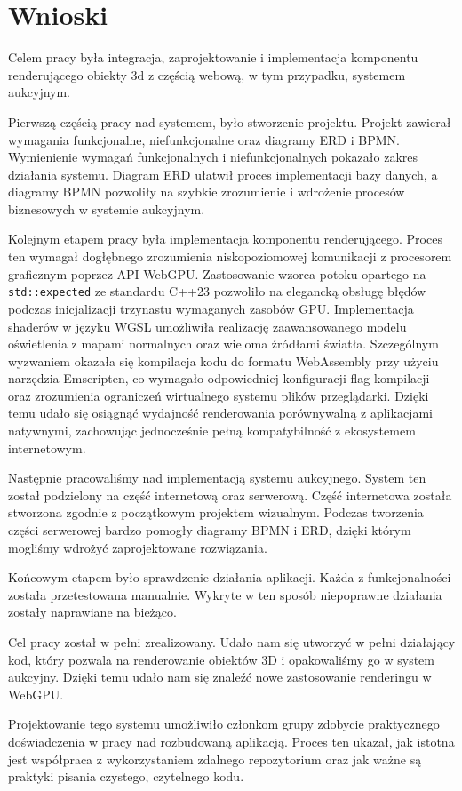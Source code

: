 \section{Wnioski}

Celem pracy była integracja, zaprojektowanie i implementacja komponentu renderującego obiekty 3d z częścią webową, w tym przypadku, systemem aukcyjnym.

Pierwszą częścią pracy nad systemem, było stworzenie projektu. Projekt zawierał wymagania funkcjonalne, niefunkcjonalne oraz diagramy ERD i BPMN. Wymienienie wymagań funkcjonalnych i niefunkcjonalnych pokazało zakres działania systemu. Diagram ERD ułatwił proces implementacji bazy danych, a diagramy BPMN pozwoliły na szybkie zrozumienie i wdrożenie procesów biznesowych w systemie aukcyjnym.

Kolejnym etapem pracy była implementacja komponentu renderującego. Proces ten wymagał dogłębnego zrozumienia niskopoziomowej komunikacji z procesorem graficznym poprzez API WebGPU. Zastosowanie wzorca potoku opartego na \texttt{std::expected} ze standardu C++23 pozwoliło na elegancką obsługę błędów podczas inicjalizacji trzynastu wymaganych zasobów GPU. Implementacja shaderów w języku WGSL umożliwiła realizację zaawansowanego modelu oświetlenia z mapami normalnych oraz wieloma źródłami światła. Szczególnym wyzwaniem okazała się kompilacja kodu do formatu WebAssembly przy użyciu narzędzia Emscripten, co wymagało odpowiedniej konfiguracji flag kompilacji oraz zrozumienia ograniczeń wirtualnego systemu plików przeglądarki. Dzięki temu udało się osiągnąć wydajność renderowania porównywalną z aplikacjami natywnymi, zachowując jednocześnie pełną kompatybilność z ekosystemem internetowym.

Następnie pracowaliśmy nad implementacją systemu aukcyjnego. System ten został podzielony na część internetową oraz serwerową. Część internetowa została stworzona zgodnie z początkowym projektem wizualnym. Podczas tworzenia części serwerowej bardzo pomogły diagramy BPMN i ERD, dzięki którym mogliśmy wdrożyć zaprojektowane rozwiązania.

Końcowym etapem było sprawdzenie działania aplikacji. Każda z funkcjonalności została przetestowana manualnie. Wykryte w ten sposób niepoprawne działania zostały naprawiane na bieżąco.

Cel pracy został w pełni zrealizowany. Udało nam się utworzyć w pełni działający kod, który pozwala na renderowanie obiektów 3D i opakowaliśmy go w system aukcyjny. Dzięki temu udało nam się znaleźć nowe zastosowanie renderingu w WebGPU.

Projektowanie tego systemu umożliwiło członkom grupy zdobycie praktycznego doświadczenia w pracy nad rozbudowaną aplikacją. Proces ten ukazał, jak istotna jest współpraca z wykorzystaniem zdalnego repozytorium oraz jak ważne są praktyki pisania czystego, czytelnego kodu.